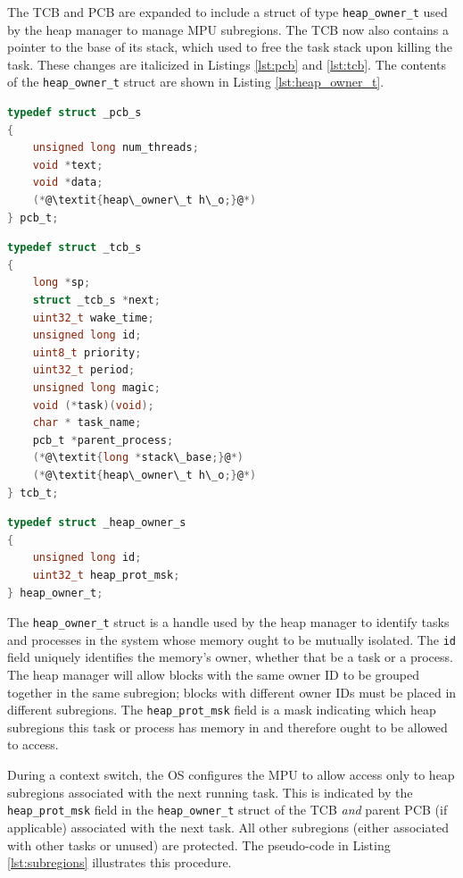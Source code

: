 The TCB and PCB are expanded to include a struct of type \texttt{heap\_owner\_t} used by the heap manager to manage MPU subregions. The TCB now also contains a pointer to the base of its stack, which used to free the task stack upon killing the task. These changes are italicized in Listings \ref{lst:pcb} and \ref{lst:tcb}. The contents of the \texttt{heap\_owner\_t} struct are shown in Listing \ref{lst:heap_owner_t}.
\begin{lstlisting}[language=c, caption={Process Control Block definition}, captionpos=b, label={lst:pcb}, float]
typedef struct _pcb_s
{
    unsigned long num_threads;
    void *text;
    void *data;
    (*@\textit{heap\_owner\_t h\_o;}@*)
} pcb_t;
\end{lstlisting}
\begin{lstlisting}[language=c, caption={Task Control Block definition}, captionpos=b, label={lst:tcb}, float]
typedef struct _tcb_s
{
    long *sp;
    struct _tcb_s *next;
    uint32_t wake_time;
    unsigned long id;
    uint8_t priority;
    uint32_t period;
    unsigned long magic;
    void (*task)(void);
    char * task_name;
    pcb_t *parent_process;
    (*@\textit{long *stack\_base;}@*)
    (*@\textit{heap\_owner\_t h\_o;}@*)
} tcb_t;
\end{lstlisting}
\begin{lstlisting}[language=c, caption={heap\_owner\_t struct definition}, captionpos=b, label={lst:heap_owner_t}, float]
typedef struct _heap_owner_s
{
    unsigned long id;
    uint32_t heap_prot_msk;
} heap_owner_t;
\end{lstlisting}

The \texttt{heap\_owner\_t} struct is a handle used by the heap manager to identify tasks and processes in the system whose memory ought to be mutually isolated. The \texttt{id} field uniquely identifies the memory's owner, whether that be a task or a process. The heap manager will allow blocks with the same owner ID to be grouped together in the same subregion; blocks with different owner IDs must be placed in different subregions. The \texttt{heap\_prot\_msk} field is a mask indicating which heap subregions this task or process has memory in and therefore ought to be allowed to access.

During a context switch, the OS configures the MPU to allow access only to heap subregions associated with the next running task. This is indicated by the \texttt{heap\_prot\_msk} field in the \texttt{heap\_owner\_t} struct of the TCB \textit{and} parent PCB (if applicable) associated with the next task. All other subregions (either associated with other tasks or unused) are protected. The pseudo-code in Listing \ref{lst:subregions} illustrates this procedure.

